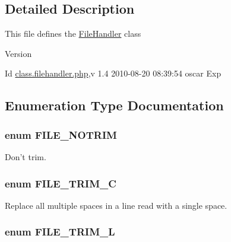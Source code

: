 \subsection{Detailed Description}
This file defines the \hyperlink{classFileHandler}{FileHandler} class \begin{DoxyVersion}{Version}

\end{DoxyVersion}
\begin{DoxyParagraph}{Id}
\hyperlink{class_8filehandler_8php}{class.filehandler.php},v 1.4 2010-\/08-\/20 08:39:54 oscar Exp 
\end{DoxyParagraph}


\subsection{Enumeration Type Documentation}
\subsubsection[{FILE\_\-NOTRIM}]{\setlength{\rightskip}{0pt plus 5cm}enum {\bf FILE\_\-NOTRIM}}\label{class_8filehandler_8php_a3720f2e15eb9e16e29d8ecbb96763662}


Don't trim. 

\subsubsection[{FILE\_\-TRIM\_\-C}]{\setlength{\rightskip}{0pt plus 5cm}enum {\bf FILE\_\-TRIM\_\-C}}\label{class_8filehandler_8php_a2787c3a1ecef8697c863800d0b2848a4}


Replace all multiple spaces in a line read with a single space. 

\subsubsection[{FILE\_\-TRIM\_\-L}]{\setlength{\rightskip}{0pt plus 5cm}enum {\bf FILE\_\-TRIM\_\-L}}\label{class_8filehandler_8php_a080de95fd7cf2e8d8ac78ac7ad9471ee}


